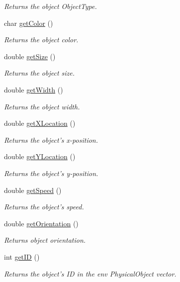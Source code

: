 \begin{DoxyCompactItemize}
\begin{DoxyCompactList}\small\item\em Returns the object Object\-Type. \end{DoxyCompactList}\item 
char \hyperlink{classPhysicalObjectClass_aa77678e94120c33115c1ca0ab7c3b303}{get\-Color} ()
\begin{DoxyCompactList}\small\item\em Returns the object color. \end{DoxyCompactList}\item 
double \hyperlink{classPhysicalObjectClass_a32ef3ee72e567f832441d0d597fd2385}{get\-Size} ()
\begin{DoxyCompactList}\small\item\em Returns the object size. \end{DoxyCompactList}\item 
double \hyperlink{classPhysicalObjectClass_a12ade657d9d1cbf10249cde977519b39}{get\-Width} ()
\begin{DoxyCompactList}\small\item\em Returns the object width. \end{DoxyCompactList}\item 
double \hyperlink{classPhysicalObjectClass_a17eb882028d4b3a95d0fee9f13ce2f5f}{get\-X\-Location} ()
\begin{DoxyCompactList}\small\item\em Returns the object's x-\/position. \end{DoxyCompactList}\item 
double \hyperlink{classPhysicalObjectClass_a43b08ed49c8ea7c51660b85b1a8e64d6}{get\-Y\-Location} ()
\begin{DoxyCompactList}\small\item\em Returns the object's y-\/position. \end{DoxyCompactList}\item 
double \hyperlink{classPhysicalObjectClass_a778e1ed4b802bfb06382d0b15c09fd29}{get\-Speed} ()
\begin{DoxyCompactList}\small\item\em Returns the object's speed. \end{DoxyCompactList}\item 
double \hyperlink{classPhysicalObjectClass_a99126574824b46b85bc2f4b831864693}{get\-Orientation} ()
\begin{DoxyCompactList}\small\item\em Returns object orientation. \end{DoxyCompactList}\item 
int \hyperlink{classPhysicalObjectClass_a73e1b1feb39c9d9252b0e2ef282a9e33}{get\-I\-D} ()
\begin{DoxyCompactList}\small\item\em Returns the object's I\-D in the env Physical\-Object vector. \end{DoxyCompactList}\end{DoxyCompactItemize}
